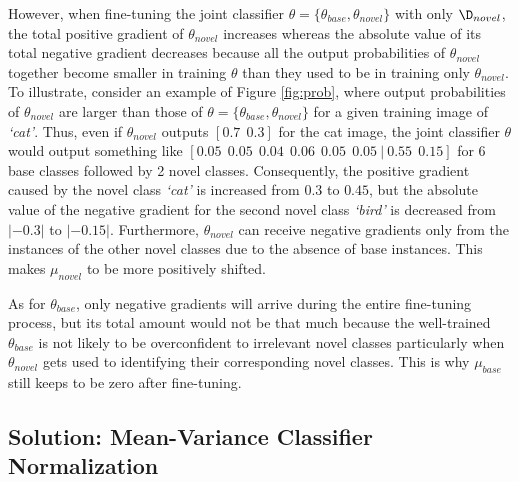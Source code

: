 However, when fine-tuning the joint classifier $\theta = \{\theta_{base}, \theta_{novel}\}$ with only $\D_{novel}$, the total positive gradient of $\theta_{novel}$ increases whereas the absolute value of its total negative gradient decreases because all the output probabilities of $\theta_{novel}$ together become smaller in training $\theta$ than they used to be in training only $\theta_{novel}$. To illustrate, consider an example of Figure \ref{fig:prob}, where output probabilities of $\theta_{novel}$ are larger than those of $\theta = \{\theta_{base}, \theta_{novel}\}$ for a given training image of \textit{`cat'}. Thus, even if $\theta_{novel}$ outputs $[0.7~~0.3]$ for the cat image, the joint classifier $\theta$ would output something like $[0.05~~0.05~~0.04~~0.06~~0.05~~0.05~|~0.55~~0.15]$ for 6 base classes followed by 2 novel classes. Consequently, the positive gradient caused by the novel class \textit{`cat'} is increased from $0.3$ to $0.45$, but the absolute value of the negative gradient for the second novel class \textit{`bird'} is decreased from $|-0.3|$ to $|-0.15|$. Furthermore, $\theta_{novel}$ can receive negative gradients only from the instances of the other novel classes due to the absence of base instances. This makes $\mu_{novel}$ to be more positively shifted. 

As for $\theta_{base}$, only negative gradients will arrive during the entire fine-tuning process, but its total amount would not be that much because the well-trained $\theta_{base}$ is not likely to be overconfident to irrelevant novel classes particularly when $\theta_{novel}$ gets used to identifying their corresponding novel classes. This is why $\mu_{base}$ still keeps to be zero after fine-tuning.





































\subsection{Solution: Mean-Variance Classifier Normalization} \label{sec:solution}

